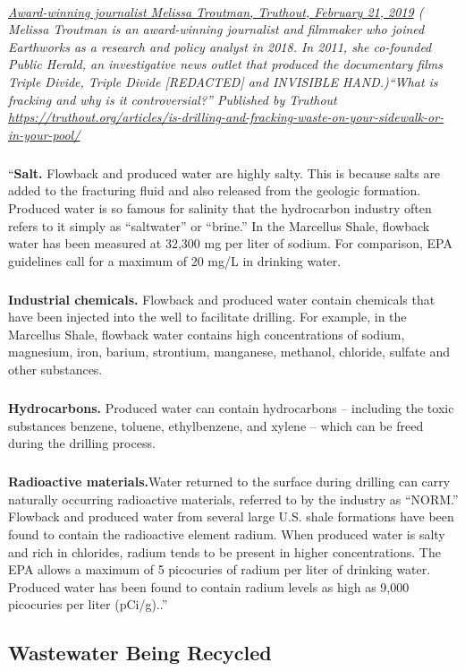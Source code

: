\documentclass{article}
\begin{document}
\paragraph{}
\small
\textit{
\underline{Award-winning journalist Melissa Troutman, Truthout, February 21, 2019}
( Melissa Troutman is an award-winning journalist and filmmaker who joined Earthworks as a research and policy analyst in 2018. In 2011, she co-founded Public Herald, an investigative news outlet that produced the documentary films Triple Divide, Triple Divide [REDACTED] and INVISIBLE HAND.)``What is fracking and why is it controversial?'' Published by Truthout
\url{https://truthout.org/articles/is-drilling-and-fracking-waste-on-your-sidewalk-or-in-your-pool/}}
\normalsize
\subparagraph{}
``\textbf{Salt.} Flowback and produced water are highly salty. This is because salts are added to the fracturing fluid and also released from the geologic formation. Produced water is so famous for salinity that the hydrocarbon industry often refers to it simply as “saltwater” or “brine.” In the Marcellus Shale, flowback water has been measured at 32,300 mg per liter of sodium. For comparison, EPA guidelines call for a maximum of 20 mg/L in drinking water.
\subparagraph{}
\textbf{Industrial chemicals.} Flowback and produced water contain chemicals that have been injected into the well to facilitate drilling. For example, in the Marcellus Shale, flowback water contains high concentrations of sodium, magnesium, iron, barium, strontium, manganese, methanol, chloride, sulfate and other substances.
\subparagraph{}
\textbf{Hydrocarbons.} Produced water can contain hydrocarbons -- including the toxic substances benzene, toluene, ethylbenzene, and xylene – which can be freed during the drilling process.
\subparagraph{}
\textbf{Radioactive materials.}Water returned to the surface during drilling can carry naturally occurring radioactive materials, referred to by the industry as “NORM.” Flowback and produced water from several large U.S. shale formations have been found to contain the radioactive element radium. When produced water is salty and rich in chlorides, radium tends to be present in higher concentrations.
The EPA allows a maximum of 5 picocuries of radium per liter of drinking water. Produced water has been found to contain radium levels as high as 9,000 picocuries per liter (pCi/g)..”

\subsection{Wastewater Being Recycled}
\end{document}
